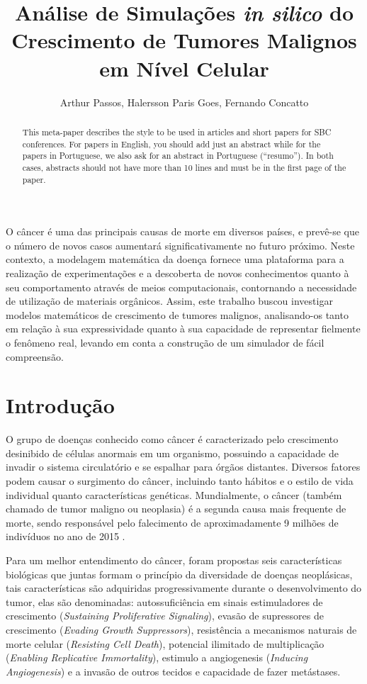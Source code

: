 \documentclass[12pt]{article}
\title{Análise de Simulações \textit{in silico} do Crescimento de Tumores Malignos em Nível Celular}
\author{Arthur Passos\inst{1}, Halersson Paris Goes\inst{1}, Fernando Concatto\inst{1}}
\begin{document}
\maketitle

\begin{abstract}
  This meta-paper describes the style to be used in articles and short papers
  for SBC conferences. For papers in English, you should add just an abstract
  while for the papers in Portuguese, we also ask for an abstract in
  Portuguese (``resumo''). In both cases, abstracts should not have more than
  10 lines and must be in the first page of the paper.
\end{abstract}

\begin{resumo}
  O câncer é uma das principais causas de morte em diversos países, e prevê-se que o número de novos casos aumentará significativamente no futuro próximo. Neste contexto, a modelagem matemática da doença fornece uma plataforma para a realização de experimentações e a descoberta de novos conhecimentos quanto à seu comportamento através de meios computacionais, contornando a necessidade de utilização de materiais orgânicos. Assim, este trabalho buscou investigar modelos matemáticos de crescimento de tumores malignos, analisando-os tanto em relação à sua expressividade quanto à sua capacidade de representar fielmente o fenômeno real, levando em conta a construção de um simulador de fácil compreensão. %
\end{resumo}

\section{Introdução}

O grupo de doenças conhecido como câncer é caracterizado pelo crescimento desinibido de células anormais em um organismo, possuindo a capacidade de invadir o sistema circulatório e se espalhar para órgãos distantes. Diversos fatores podem causar o surgimento do câncer, incluindo tanto hábitos e o estilo de vida individual quanto características genéticas. Mundialmente, o câncer (também chamado de tumor maligno ou neoplasia) é a segunda causa mais frequente de morte, sendo responsável pelo falecimento de aproximadamente 9 milhões de indivíduos no ano de 2015 \cite{WHO2017,ACS2017}.

Para um melhor entendimento do câncer, foram propostas seis características biológicas que juntas formam o princípio da diversidade de doenças neoplásicas, tais características são adquiridas progressivamente durante o desenvolvimento do tumor, elas são denominadas: autossuficiência em sinais estimuladores de crescimento (\emph{Sustaining Proliferative Signaling}), evasão de supressores de crescimento (\emph{Evading Growth Suppressors}), resistência a mecanismos naturais de morte celular (\emph{Resisting Cell Death}), potencial ilimitado de multiplicação (\emph{Enabling Replicative Immortality}), estimulo a angiogenesis (\emph{Inducing Angiogenesis}) e a invasão de outros tecidos e capacidade de fazer metástases.
\end{document}
